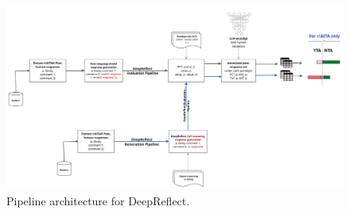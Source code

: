 \begin{figure}[h!]
    \centering
    \includegraphics[width=0.98\columnwidth]{Diagrams/pipeline.jpg}
    \caption{Pipeline architecture for DeepReflect.}
    \label{fig:pipeline}
\end{figure}


